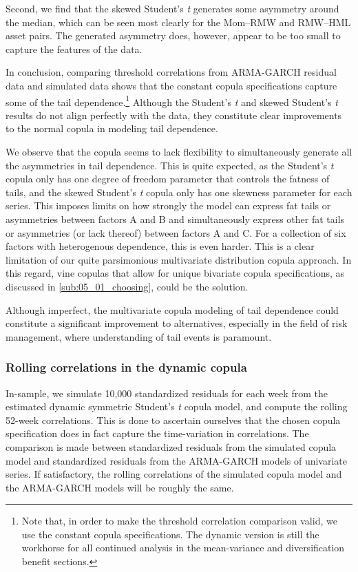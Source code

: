 Second, we find that the skewed Student's \textit{t} generates some asymmetry around the median, which can be seen most clearly for the Mom--RMW and RMW--HML asset pairs. The generated asymmetry does, however, appear to be too small to capture the features of the data.

In conclusion, comparing threshold correlations from ARMA-GARCH residual data and simulated data shows that the constant copula specifications capture some of the tail dependence.\footnote{Note that, in order to make the threshold correlation comparison valid, we use the constant copula specifications. The dynamic version is still the workhorse for all continued analysis in the mean-variance and diversification benefit sections.} Although the Student's \textit{t} and skewed Student's \textit{t} results do not align perfectly with the data, they constitute clear improvements to the normal copula in modeling tail dependence. 

We observe that the copula seems to lack flexibility to simultaneously generate all the asymmetries in tail dependence. This is quite expected, as the Student's \textit{t} copula only has one degree of freedom parameter that controls the fatness of tails, and the skewed Student's \textit{t} copula only has one skewness parameter for each series. This imposes limits on how strongly the model can express fat tails or asymmetries between factors A and B and simultaneously express other fat tails or asymmetries (or lack thereof) between factors A and C. For a collection of six factors with heterogenous dependence, this is even harder. This is a clear limitation of our quite parsimonious multivariate distribution copula approach. In this regard, vine copulas that allow for unique bivariate copula specifications, as discussed in \autoref{sub:05_01_choosing}, could be the solution.

Although imperfect, the multivariate copula modeling of tail dependence could constitute a significant improvement to alternatives, especially in the field of risk management, where understanding of tail events is paramount.

\subsubsection{Rolling correlations in the dynamic copula}

In-sample, we simulate 10,000 standardized residuals for each week from the estimated dynamic symmetric Student's \textit{t} copula model, and compute the rolling 52-week correlations. This is done to ascertain ourselves that the chosen copula specification does in fact capture the time-variation in correlations. The comparison is made between standardized residuals from the simulated copula model and standardized residuals from the ARMA-GARCH models of univariate series. If satisfactory, the rolling correlations of the simulated copula model and the ARMA-GARCH models will be roughly the same.

